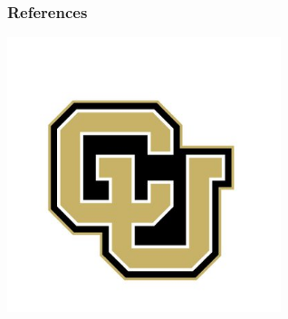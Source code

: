 \documentclass{beamer}
\begin{document}
\begin{frame}
\frametitle{References}


\end{frame}


\begin{frame}
\begin{center}
\includegraphics[width=0.6\textwidth]{SkoBuffs.jpg}
\end{center}
\end{frame}

\end{document}
